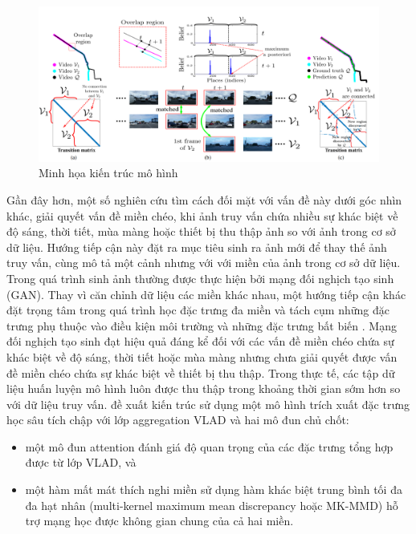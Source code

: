 \begin{figure}[H]
    \centering
    \includegraphics[width=\textwidth]{pics/Chapter2/model3step.png}
    \caption{Minh họa kiến trúc mô hình \cite{doan2019scalable}}
\end{figure}

Gần đây hơn, một số nghiên cứu tìm cách đối mặt với vấn đề này dưới góc nhìn khác, giải quyết vấn đề miền chéo, khi ảnh truy vấn chứa nhiều sự khác biệt về độ sáng, thời tiết, mùa màng hoặc thiết bị thu thập ảnh so với ảnh trong cơ sở dữ liệu. Hướng tiếp cận này đặt ra mục tiêu sinh ra ảnh mới để thay thế ảnh truy vấn, cùng mô tả một cảnh nhưng với với miền của ảnh trong cơ sở dữ liệu. Trong \cite{Porav2018AdversarialTF, Annosheh2019Night} quá trình sinh ảnh thường được thực hiện bởi mạng đối nghịch tạo sinh (GAN). Thay vì căn chỉnh dữ liệu các miền khác nhau, một hướng tiếp cận khác đặt trọng tâm trong quá trình học đặc trưng đa miền và tách cụm những đặc trưng phụ thuộc vào điều kiện môi trường và những đặc trưng bất biến \cite{yin2019multi}. Mạng đối nghịch tạo sinh đạt hiệu quả đáng kể đối với các vấn đề miền chéo chứa sự khác biệt về độ sáng, thời tiết hoặc mùa màng nhưng chưa giải quyết được vấn đề miền chéo chứa sự khác biệt về thiết bị thu thập. Trong thực tế, các tập dữ liệu huấn luyện mô hình luôn được thu thập trong khoảng thời gian sớm hơn so với dữ liệu truy vấn. \cite{wang2019attention} đề xuất kiến trúc sử dụng một mô hình trích xuất đặc trưng học sâu tích chập với lớp aggregation VLAD \cite{jegou2010aggregating} và hai mô đun chủ chốt:

\begin{itemize}
    \item một mô đun attention đánh giá độ quan trọng của các đặc trưng tổng hợp được từ lớp VLAD, và
    \item một hàm mất mát thích nghi miền sử dụng hàm khác biệt trung bình tối đa đa hạt nhân (multi-kernel maximum mean discrepancy hoặc MK-MMD) hỗ trợ mạng học được không gian chung của cả hai miền.
\end{itemize}

